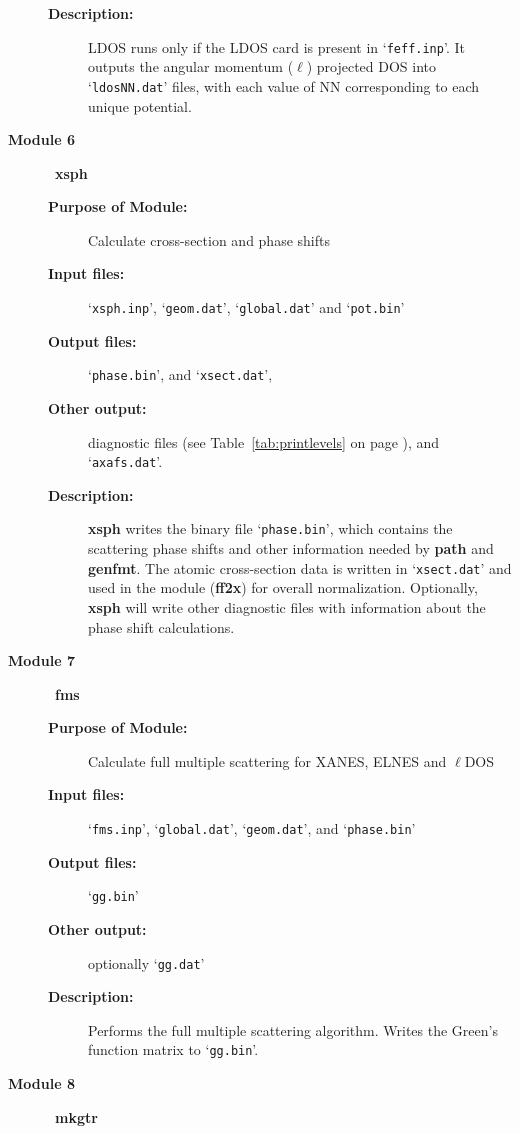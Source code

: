\documentclass[11pt,oneside]{report} %
\newcommand{\file}[1]{`\texttt{#1}'}
\newcommand{\module}[1]{\textrm{\bf{#1}}}
\begin{document}
\begin{latexonly}
\begin{description}
\begin{description}
  \item[\textbf{Description:}] LDOS runs only if the LDOS card is 
    present in \file{feff.inp}. It outputs the angular momentum ($\ell$) projected DOS 
    into \file{ldosNN.dat} files, with each value of NN corresponding 
    to each unique potential.
  \end{description}
\item [\large\textbf{Module 6}]\dotfill\  {\large\module{xsph}}
  \begin{description}
  \item[\textbf{Purpose of Module:}] Calculate cross-section and phase shifts
  \item[\textbf{Input files:}] \file{xsph.inp}, \file{geom.dat},
    \file{global.dat} and \file{pot.bin}
  \item[\textbf{Output files:}] \file{phase.bin}, and \file{xsect.dat},
  \item[\textbf{Other output:}] diagnostic files (see
  Table~\ref{tab:printlevels} on page \pageref{tab:printlevels}),
    and \file{axafs.dat}.
  \item[\textbf{Description:}]  \module{xsph} writes the binary file
    \file{phase.bin}, which contains the scattering phase shifts and
    other information needed by \module{path} and \module{genfmt}. 
    The  atomic  cross-section data is written in \file{xsect.dat} and
    used in the module (\module{ff2x}) for overall normalization.
    Optionally, \module{xsph} will write other diagnostic files with 
    information about the phase shift calculations.
  \end{description}
\item [\large\textbf{Module 7}]\dotfill\  {\large\module{fms}}
  \begin{description}
  \item[\textbf{Purpose of Module:}] Calculate full multiple
  scattering for XANES, ELNES and $\ell$DOS
  \item[\textbf{Input files:}] \file{fms.inp}, \file{global.dat},
     \file{geom.dat}, and \file{phase.bin}
  \item[\textbf{Output files:}] \file{gg.bin}
  \item[\textbf{Other output:}] optionally \file{gg.dat}
  \item[\textbf{Description:}]  Performs the full multiple scattering
    algorithm.  Writes the Green's function matrix to \file{gg.bin}.
  \end{description}
\item [\large\textbf{Module 8}]\dotfill\  {\large\module{mkgtr}}

\end{description}
\end{latexonly}
\end{document}
